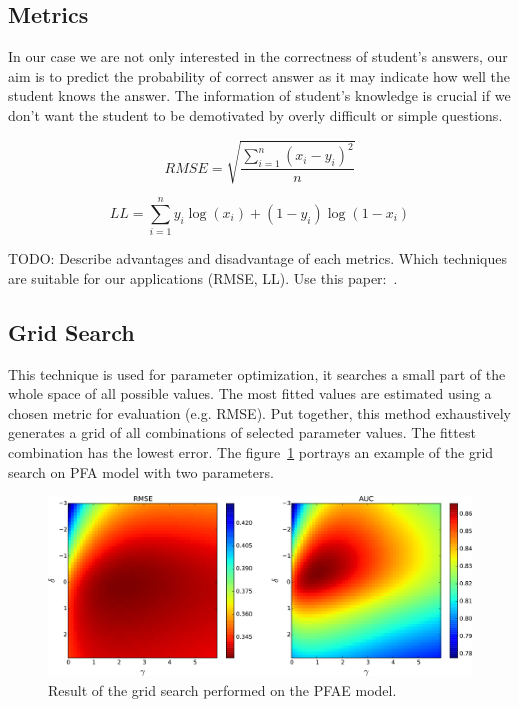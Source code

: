 \subsection{Metrics}

In our case we are not only interested in the correctness of student's answers, our aim is to predict the probability of correct answer as it may indicate how well the student knows the answer. The information of student's knowledge is crucial if we don't want the student to be demotivated by overly difficult or simple questions.

\begin{equation} \label{rmse}
  RMSE = \sqrt{\frac{\sum_{i=1}^n (x_i - y_i)^2}{n}}
\end{equation}

\begin{equation} \label{ll}
  LL = \sum_{i=1}^n y_i \log(x_i) + (1 - y_i) \log(1 - x_i)
\end{equation}

TODO: Describe advantages and disadvantage of each metrics. Which techniques are suitable for our applications (RMSE, LL). Use this paper:~\cite{Pelanek2015a}.

\subsection{Grid Search}

This technique is used for parameter optimization, it searches a small part of the whole space of all possible values. The most fitted values are estimated using a chosen metric for evaluation (e.g. RMSE). Put together, this method exhaustively generates a grid of all combinations of selected parameter values. The fittest combination has the lowest error. The figure~\ref{fig-grid-search-rmse-auc} portrays an example of the grid search on PFA model with two parameters.

\begin{figure}[htbp]
  \centering
  \includegraphics[width=\textwidth]{img/pfa-grid-search-rmse-auc}
  \caption{Result of the grid search performed on the PFAE model.}
  \label{fig-grid-search-rmse-auc}
\end{figure}

